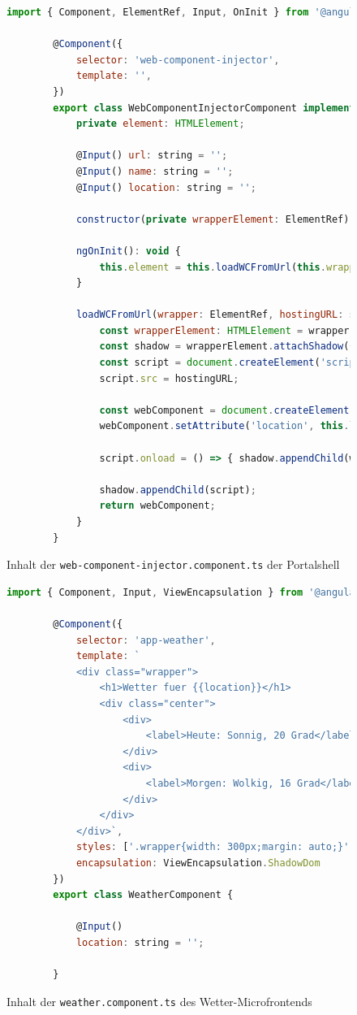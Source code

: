 \newpage
\begin{figure}[bht]
	\begin{lstlisting}[caption=Komponente zur Einbindung von Web Components, label=list:WCInjectionComponent, language=Javascript]
		import { Component, ElementRef, Input, OnInit } from '@angular/core';
		
		@Component({
			selector: 'web-component-injector',
			template: '',
		})
		export class WebComponentInjectorComponent implements OnInit {
			private element: HTMLElement;
			
			@Input() url: string = '';
			@Input() name: string = '';
			@Input() location: string = '';
			
			constructor(private wrapperElement: ElementRef) { }
			
			ngOnInit(): void {
				this.element = this.loadWCFromUrl(this.wrapperElement, this.url, this.name );
			}
			
			loadWCFromUrl(wrapper: ElementRef, hostingURL: string, htmlTagName: string) : HTMLElement {
				const wrapperElement: HTMLElement = wrapper.nativeElement;
				const shadow = wrapperElement.attachShadow({mode: 'open'});
				const script = document.createElement('script');
				script.src = hostingURL;
				
				const webComponent = document.createElement(htmlTagName);
				webComponent.setAttribute('location', this.location);
				
				script.onload = () => { shadow.appendChild(webComponent); }
				
				shadow.appendChild(script);
				return webComponent;
			}
		}
	\end{lstlisting}
	\footnoterule{}
	\footnotesize{Inhalt der \texttt{web-component-injector.component.ts} der Portalshell}
\end{figure}

\newpage
\begin{figure}[bht]
	\begin{lstlisting}[caption=Quellcode der Weather-Component, label=list:SourceCodeWeatherComponent, language=Javascript]
		import { Component, Input, ViewEncapsulation } from '@angular/core';
		
		@Component({
			selector: 'app-weather',
			template: `
			<div class="wrapper">
				<h1>Wetter fuer {{location}}</h1>
				<div class="center">
					<div>
						<label>Heute: Sonnig, 20 Grad</label>
					</div>
					<div>
						<label>Morgen: Wolkig, 16 Grad</label>
					</div>
				</div>
			</div>`,
			styles: ['.wrapper{width: 300px;margin: auto;}', '.center{display: inline;float: none;text-align: center;}'],
			encapsulation: ViewEncapsulation.ShadowDom
		})
		export class WeatherComponent {
			
			@Input()
			location: string = '';
			
		}
	\end{lstlisting}
	\footnoterule{}
	\footnotesize{Inhalt der \texttt{weather.component.ts} des Wetter-Microfrontends}
\end{figure}

